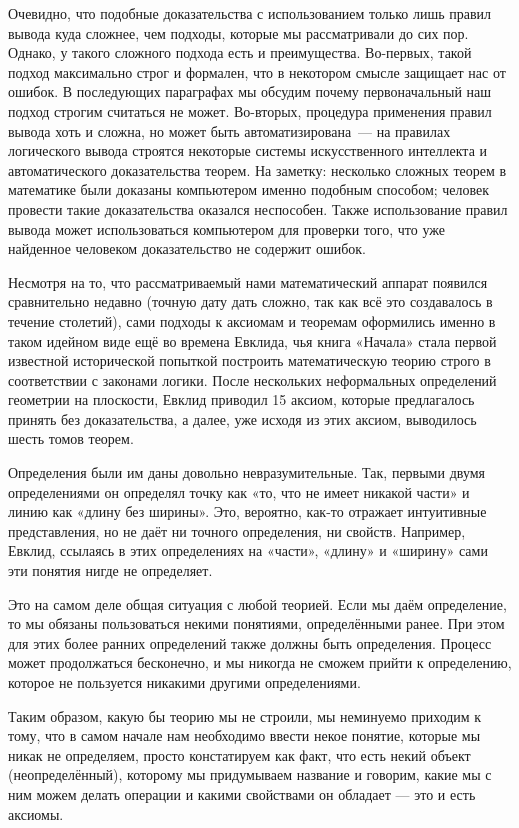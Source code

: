 Очевидно, что подобные доказательства с использованием только лишь правил вывода куда сложнее, чем подходы, которые мы рассматривали до сих пор. Однако, у такого сложного подхода есть и преимущества. Во-первых, такой подход максимально строг и формален, что в некотором смысле защищает нас от ошибок. В последующих параграфах мы обсудим почему первоначальный наш подход строгим считаться не может. Во-вторых, процедура применения правил вывода хоть и сложна, но может быть автоматизирована~— на правилах логического вывода строятся некоторые системы искусственного интеллекта и автоматического доказательства теорем. На заметку: несколько сложных теорем в математике были доказаны компьютером именно подобным способом; человек провести такие доказательства оказался неспособен. Также использование правил вывода может использоваться компьютером для проверки того, что уже найденное человеком доказательство не содержит ошибок.

Несмотря на то, что рассматриваемый нами математический аппарат появился сравнительно недавно (точную дату дать сложно, так как всё это создавалось в течение столетий), сами подходы к аксиомам и теоремам оформились именно в таком идейном виде ещё во времена Евклида, чья книга «Начала» стала первой известной исторической попыткой построить математическую теорию строго в соответствии с законами логики. После нескольких неформальных определений геометрии на плоскости, Евклид приводил 15 аксиом, которые предлагалось принять без доказательства, а далее, уже исходя из этих аксиом, выводилось шесть томов теорем.

Определения были им даны довольно невразумительные. Так, первыми двумя определениями он определял точку как «то, что не имеет никакой части» и линию как «длину без ширины». Это, вероятно, как-то отражает интуитивные представления, но не даёт ни точного определения, ни свойств. Например, Евклид, ссылаясь в этих определениях на «части», «длину» и «ширину» сами эти понятия нигде не определяет.

Это на самом деле общая ситуация с любой теорией. Если мы даём определение, то мы обязаны пользоваться некими понятиями, определёнными ранее. При этом для этих более ранних определений также должны быть определения. Процесс может продолжаться бесконечно, и мы никогда не сможем прийти к определению, которое не пользуется никакими другими определениями.

Таким образом, какую бы теорию мы не строили, мы неминуемо приходим к тому, что в самом начале нам необходимо ввести некое понятие, которые мы никак не определяем, просто констатируем как факт, что есть некий объект (неопределённый), которому мы придумываем название и говорим, какие мы с ним можем делать операции и какими свойствами он обладает — это и есть аксиомы.


